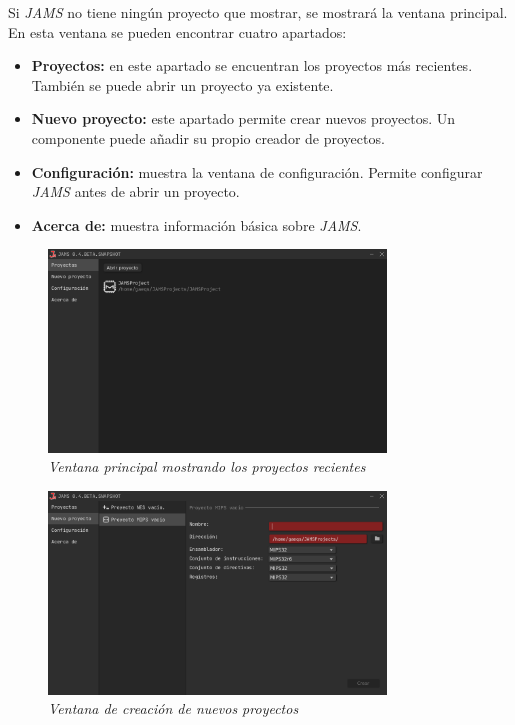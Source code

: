 Si \textit{JAMS} no tiene ningún proyecto que mostrar, se mostrará la ventana
principal.
En esta ventana se pueden encontrar cuatro apartados:
\begin{itemize}
    \item \textbf{Proyectos:} en este apartado se encuentran los proyectos más
    recientes.
    También se puede abrir un proyecto ya existente.
    \item \textbf{Nuevo proyecto:} este apartado permite crear nuevos proyectos.
    Un componente puede añadir su propio creador de proyectos.
    \item \textbf{Configuración:} muestra la ventana de configuración.
    Permite configurar \textit{JAMS} antes de abrir un proyecto.
    \item \textbf{Acerca de:} muestra información básica sobre \textit{JAMS}.
\end{itemize}

\begin{figure}[H]
    \centering
    \includegraphics[width=0.8\textwidth]{images/base/jams-main-projects}
    \caption{\textit{Ventana principal mostrando los proyectos recientes}}
    \label{fig:jams-main-projects}
\end{figure}

\begin{figure}[H]
    \centering
    \includegraphics[width=0.8\textwidth]{images/base/jams-main-new-project}
    \caption{\textit{Ventana de creación de nuevos proyectos}}
    \label{fig:jams-main-new-project}
\end{figure}


